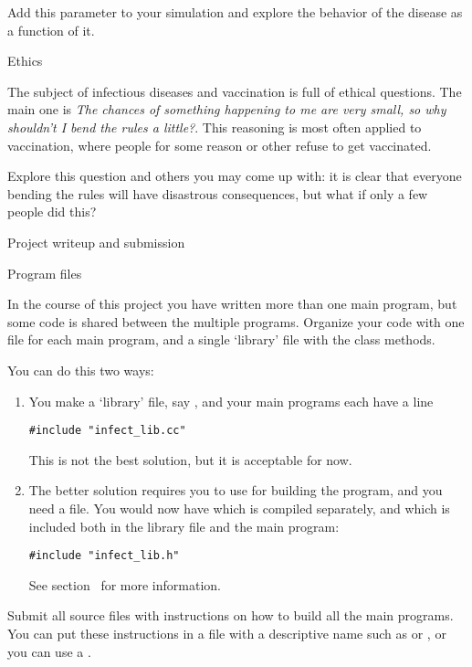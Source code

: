 Add this parameter to your simulation and explore the behavior
of the disease as a function of it.

 {Ethics}

The subject of infectious diseases and vaccination
is full of ethical questions.
The main one is \emph{The chances of something happening to me
are very small, so why shouldn't I bend the rules a little?}.
This reasoning is most often applied to vaccination,
where people for some reason or other refuse to get vaccinated.

Explore this question and others you may come up with:
it is clear that everyone bending the rules will have disastrous
consequences, but what if only a few people did this?

 {Project writeup and submission}

 {Program files}

In the course of this project you have written more than one main
program, but some code is shared between the multiple programs.
Organize your code with one file for each main program, and a single
`library' file with the class methods.

You can do this two ways:
\begin{enumerate}
\item You make a `library' file, say ,
  and your main programs each have a line
\begin{lstlisting}
#include "infect_lib.cc"
\end{lstlisting}
This is not the best solution, but it is acceptable for now.
\item The better solution requires you to use
   for building the program, and you
  need a  file.
  You would now have  which is compiled separately,
  and  which is included both in the library file and the main program:
\begin{lstlisting}
#include "infect_lib.h"
\end{lstlisting}
\begin{inbook}
  See section~ for more information.
\end{inbook}
\end{enumerate}

Submit all source files with instructions on how to build all the main
programs. You can put these instructions in a file with a descriptive
name such as  or , or you can use a
.

